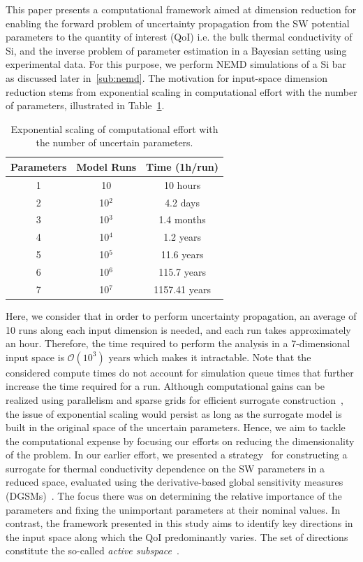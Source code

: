 This paper presents a computational framework aimed at dimension reduction
for enabling the forward problem of uncertainty propagation from the SW potential 
parameters to the quantity of interest (QoI) i.e. the bulk thermal conductivity of Si,
and the inverse problem of parameter estimation in a Bayesian setting using 
experimental data. For this purpose, we perform NEMD simulations of a Si bar
as discussed later in~\ref{sub:nemd}. The
motivation for input-space dimension reduction stems from exponential scaling in
computational effort with the number of parameters, illustrated in Table~\ref{tab:effort}. 
%
\newcommand{\ra}[1]{\renewcommand{\arraystretch}{#1}}
\begin{table}[htbp]
\centering
\ra{1.3}
\begin{tabular}{@{}ccc@{}}\toprule
Parameters & Model Runs & Time (1h/run)\\
\bottomrule
1 & 10 & 10 hours \\
2 & 10$^2$ & 4.2 days \\
3 & 10$^3$ & 1.4 months \\
4 & 10$^4$ & 1.2 years \\
5 & 10$^5$ & 11.6 years \\
6 & 10$^6$ & 115.7 years \\
7 & 10$^7$ & 1157.41 years \\
\bottomrule
\end{tabular}
\caption{Exponential scaling of computational effort with the number of uncertain parameters.}
\label{tab:effort}
\end{table}
%
Here, we consider that in order to perform uncertainty propagation,
an average of 10 runs along each input dimension
is needed, and each run takes approximately an hour. Therefore, the time required to 
perform the analysis in a 7-dimensional input space is $\mathcal{O}(10^3)$ years which makes it
intractable. Note that the considered compute times do not account for simulation queue times that further 
increase the time required for a run. 
Although computational gains can be realized using parallelism and sparse grids
for efficient surrogate construction~\cite{Bichon:2008,Ma:2009,Constantine:2012,Petvipusit:2014,Vohra:2014,Hu:2016}, 
the issue of exponential scaling would persist as long as the surrogate model is built in the original space of
the uncertain parameters.  
Hence, we aim to tackle the computational expense by focusing our efforts on reducing the 
dimensionality of the problem.
In our earlier effort, we presented a strategy~\cite{Vohra:2018b}
for constructing a surrogate for thermal conductivity dependence on the SW parameters
in a reduced space, evaluated using the derivative-based global sensitivity measures
(DGSMs)~\cite{Vohra:2018a}. The focus there was on determining the relative importance of the
parameters and fixing the unimportant parameters at their nominal values. In contrast, the
framework presented in this study aims to identify key directions in the input space along which the
QoI predominantly varies. The set of directions constitute the so-called 
\textit{active subspace}~\cite{Constantine:2015}.  

